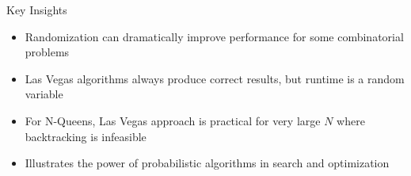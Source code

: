 \begin{frame}{Key Insights}
  \begin{itemize}
    \item Randomization can dramatically improve performance for some combinatorial problems \parencite{motwani1995randomized}
    \item Las Vegas algorithms always produce correct results, but runtime is a random variable \parencite{lasvegas1979babai}
    \item For N-Queens, Las Vegas approach is practical for very large $N$ where backtracking is infeasible
    \item Illustrates the power of probabilistic algorithms in search and optimization
  \end{itemize}
\end{frame}